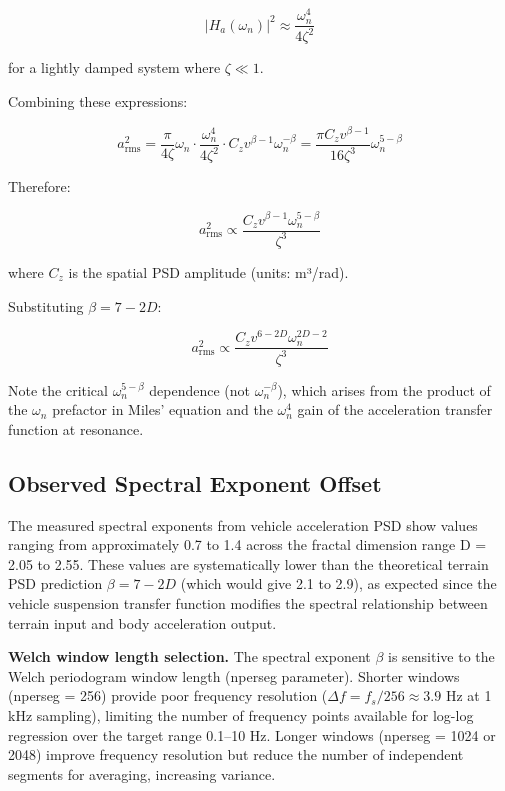 \documentclass[11pt]{article}
\begin{document}
\begin{equation}
|H_a(\omega_n)|^2 \approx \frac{\omega_n^4}{4\zeta^2}
\end{equation}

for a lightly damped system where $\zeta \ll 1$.

Combining these expressions:

\begin{equation}
a_{\text{rms}}^2 = \frac{\pi}{4\zeta} \omega_n \cdot \frac{\omega_n^4}{4\zeta^2} \cdot C_z v^{\beta-1} \omega_n^{-\beta} = \frac{\pi C_z v^{\beta-1}}{16\zeta^3} \omega_n^{5-\beta}
\end{equation}

Therefore:

\begin{equation}
a_{\text{rms}}^2 \propto \frac{C_z v^{\beta-1} \omega_n^{5-\beta}}{\zeta^3}
\end{equation}

where $C_z$ is the spatial PSD amplitude (units: m³/rad).

Substituting $\beta = 7-2D$:

\begin{equation}
a_{\text{rms}}^2 \propto \frac{C_z v^{6-2D} \omega_n^{2D-2}}{\zeta^3}
\end{equation}

Note the critical $\omega_n^{5-\beta}$ dependence (not $\omega_n^{-\beta}$), which arises from the product of the $\omega_n$ prefactor in Miles' equation and the $\omega_n^4$ gain of the acceleration transfer function at resonance.


\subsection{Observed Spectral Exponent Offset}

The measured spectral exponents from vehicle acceleration PSD show values ranging from approximately 0.7 to 1.4 across the fractal dimension range D = 2.05 to 2.55. These values are systematically lower than the theoretical terrain PSD prediction $\beta = 7-2D$ (which would give 2.1 to 2.9), as expected since the vehicle suspension transfer function modifies the spectral relationship between terrain input and body acceleration output.

\textbf{Welch window length selection.} The spectral exponent $\beta$ is sensitive to the Welch periodogram window length (nperseg parameter). Shorter windows (nperseg = 256) provide poor frequency resolution ($\Delta f = f_s/256 \approx 3.9$ Hz at 1 kHz sampling), limiting the number of frequency points available for log-log regression over the target range 0.1--10 Hz. Longer windows (nperseg = 1024 or 2048) improve frequency resolution but reduce the number of independent segments for averaging, increasing variance. 
\end{document}
